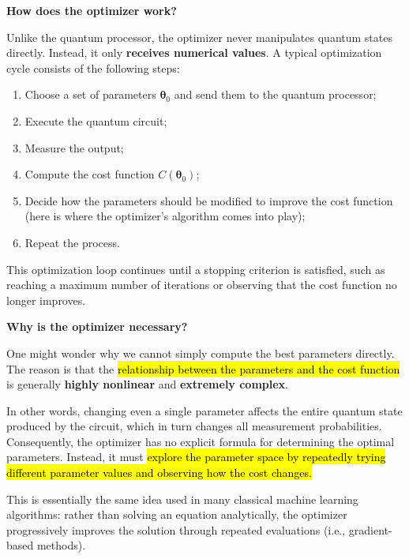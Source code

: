 \highspace
\begin{flushleft}
    \textcolor{Green3}{ \textbf{How does the optimizer work?}}
\end{flushleft}
Unlike the quantum processor, the optimizer never manipulates quantum states directly. Instead, it only \textbf{receives numerical values}. A typical optimization cycle consists of the following steps:
\begin{enumerate}
    \item Choose a set of parameters $\boldsymbol{\theta}_0$ and send them to the quantum processor;
    \item Execute the quantum circuit;
    \item Measure the output;
    \item Compute the cost function $C\left(\boldsymbol{\theta}_0\right)$;
    \item Decide how the parameters should be modified to improve the cost function (here is where the optimizer's algorithm comes into play);
    \item Repeat the process.
\end{enumerate}
This optimization loop continues until a stopping criterion is satisfied, such as reaching a maximum number of iterations or observing that the cost function no longer improves.

\highspace
\begin{flushleft}
    \textcolor{Green3}{ \textbf{Why is the optimizer necessary?}}
\end{flushleft}
One might wonder why we cannot simply compute the best parameters directly. The reason is that the \hl{relationship between the parameters and the cost function} is generally \textbf{highly nonlinear} and \textbf{extremely complex}.

\highspace
In other words, changing even a single parameter affects the entire quantum state produced by the circuit, which in turn changes all measurement probabilities. Consequently, the optimizer has no explicit formula for determining the optimal parameters. Instead, it must \hl{explore the parameter space by repeatedly trying different parameter values and observing how the cost changes.}

\highspace
This is essentially the same idea used in many classical machine learning algorithms: rather than solving an equation analytically, the optimizer progressively improves the solution through repeated evaluations (i.e., gradient-based methods).

